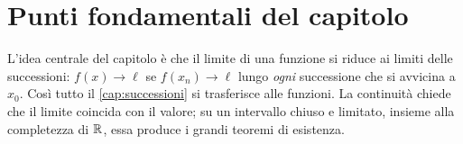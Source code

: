 \section{Punti fondamentali del capitolo}
\label{sec:sintesi-cap04}

L'idea centrale del capitolo è che il limite di una funzione si riduce ai limiti delle
successioni: $f(x)\to\ell$ se $f(x_{n})\to\ell$ lungo \emph{ogni} successione che si
avvicina a $x_{0}$. Così tutto il \cref{cap:successioni} si trasferisce alle funzioni.
La continuità chiede che il limite coincida con il valore; su un intervallo chiuso e
limitato, insieme alla completezza di $\mathbb{R}$, essa produce i grandi teoremi di esistenza.

